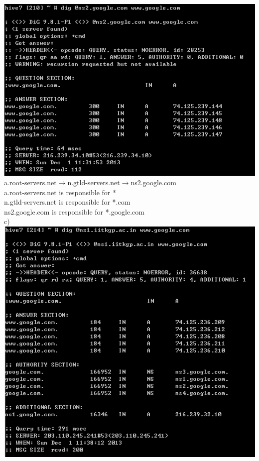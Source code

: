 \documentclass[11pt]{article}
\begin{document}
\includegraphics[scale=0.38]{122-hw3-4}\\
a.root-servers.net$\rightarrow$n.gtld-servers.net$\rightarrow$ns2.google.com\\
a.root-servers.net is responsible for *\\
n.gtld-servers.net is responsible for *.com\\
ns2.google.com is responsible for *.google.com\\
\newpage
c)\\
\includegraphics[scale=0.5]{122-hw3-5}\\
\end{document}
